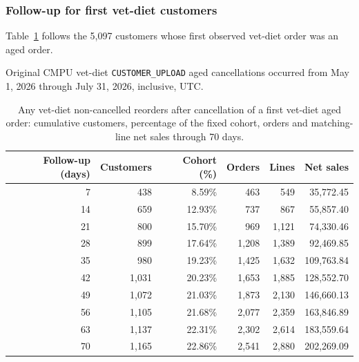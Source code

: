 \clearpage
\subsubsection{Follow-up for first vet-diet customers}
Table~\ref{tab:financial-opportunity-new-vet-diet-any-vet-diet} follows the
5,097 customers whose first observed vet-diet order was an aged order.

Original CMPU vet-diet
\texttt{CUSTOMER\_UPLOAD} aged cancellations occurred from
May 1, 2026 through July 31, 2026, inclusive, UTC.

\begin{table}[!htbp]
\centering
\caption{Any vet-diet non-cancelled reorders after cancellation of a first vet-diet aged order: cumulative customers, percentage of the fixed cohort, orders and matching-line net sales through 70 days.}
\label{tab:financial-opportunity-new-vet-diet-any-vet-diet}
\begin{tabular}{@{}rrrrrr@{}}
\toprule
Follow-up (days) & Customers & Cohort (\%) & Orders & Lines & Net sales \\
\midrule
7 & 438 & 8.59\% & 463 & 549 & 35,772.45 \\
14 & 659 & 12.93\% & 737 & 867 & 55,857.40 \\
21 & 800 & 15.70\% & 969 & 1,121 & 74,330.46 \\
28 & 899 & 17.64\% & 1,208 & 1,389 & 92,469.85 \\
35 & 980 & 19.23\% & 1,425 & 1,632 & 109,763.84 \\
42 & 1,031 & 20.23\% & 1,653 & 1,885 & 128,552.70 \\
49 & 1,072 & 21.03\% & 1,873 & 2,130 & 146,660.13 \\
56 & 1,105 & 21.68\% & 2,077 & 2,359 & 163,846.89 \\
63 & 1,137 & 22.31\% & 2,302 & 2,614 & 183,559.64 \\
70 & 1,165 & 22.86\% & 2,541 & 2,880 & 202,269.09 \\
\bottomrule
\end{tabular}


\end{table}
